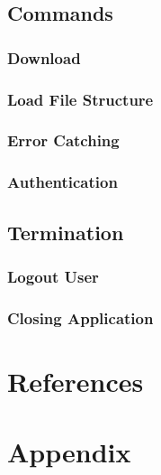 \documentclass{article}
\begin{document}
        \subsection{Commands}
            \subsubsection{Download}
            
            \subsubsection{Load File Structure}

            \subsubsection{Error Catching}

            \subsubsection{Authentication}

        \subsection{Termination}
            \subsubsection{Logout User}

            \subsubsection{Closing Application}

    \section*{References}

    \appendix
    \section{Appendix}
\end{document}
